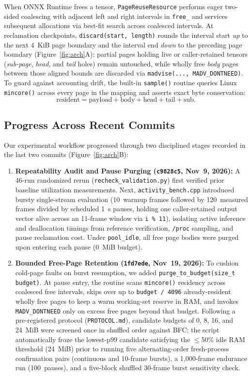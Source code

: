 \documentclass[sigconf,screen,nonacm]{acmart}
\begin{document}
When ONNX Runtime frees a tensor, \texttt{PageReuseResource} performs eager two-sided coalescing with adjacent left and right intervals in \texttt{free\_} and services subsequent allocations via best-fit search across coalesced intervals. At reclamation checkpoints, \texttt{discard(start, length)} rounds the interval start \textit{up} to the next 4~KiB page boundary and the interval end \textit{down} to the preceding page boundary (Figure~\ref{fig:arch}A): partial pages holding live or caller-retained tensors (\textit{sub-page}, \textit{head}, and \textit{tail} holes) remain untouched, while wholly free \textit{body} pages between those aligned bounds are discarded via \texttt{madvise(..., MADV\_DONTNEED)}. To guard against accounting drift, the built-in \texttt{sample()} routine queries Linux \texttt{mincore()} across every page in the mapping and asserts exact byte conservation:
\[
  \mathrm{resident} = \mathrm{payload} + \mathrm{body} + \mathrm{head} + \mathrm{tail} + \mathrm{sub}.
\]

\subsection{Progress Across Recent Commits}
Our experimental workflow progressed through two disciplined stages recorded in the last two commits (Figure~\ref{fig:arch}B):
\begin{enumerate}
  \item \textbf{Repeatability Audit and Pause Purging (\texttt{c9828c5}, Nov~9, 2026):} A 46-run randomized rerun (\texttt{recheck\_\allowbreak validation.py}) first verified prior baseline utilization measurements. Next, \texttt{activity\_\allowbreak bench.cpp} introduced bursty single-stream evaluation (10~warmup frames followed by 120~measured frames divided by scheduled 1~s pauses, holding one caller-retained output vector alive across an 11-frame window via \texttt{i \% 11}), isolating active inference and deallocation timings from reference verification, \texttt{/proc} sampling, and pause reclamation cost. Under \texttt{pool\_\allowbreak idle}, all free page bodies were purged upon entering each pause (0~MiB budget).
  \item \textbf{Bounded Free-Page Retention (\texttt{1fd7ede}, Nov~19, 2026):} To cushion cold-page faults on burst resumption, we added \texttt{purge\_\allowbreak to\_\allowbreak budget(\allowbreak size\_t budget)}. At pause entry, the routine scans \texttt{mincore()} residency across coalesced free intervals, skips over up to \texttt{budget / 4096} already-resident wholly free pages to keep a warm working-set reserve in RAM, and invokes \texttt{MADV\_\allowbreak DONTNEED} only on excess free pages beyond that budget. Following a pre-registered protocol (\texttt{PROTOCOL.md}), candidate budgets of 0, 8, 16, and 24~MiB were screened once in shuffled order against BFC; the script automatically froze the lowest-p99 candidate satisfying the $\le$50\% idle RAM threshold (24~MiB) prior to running five alternating-order fresh-process confirmation pairs (continuous and 10-frame bursts), a 1,000-frame endurance run (100~pauses), and a five-block shuffled 30-frame burst sensitivity check.
\end{enumerate}
\end{document}
